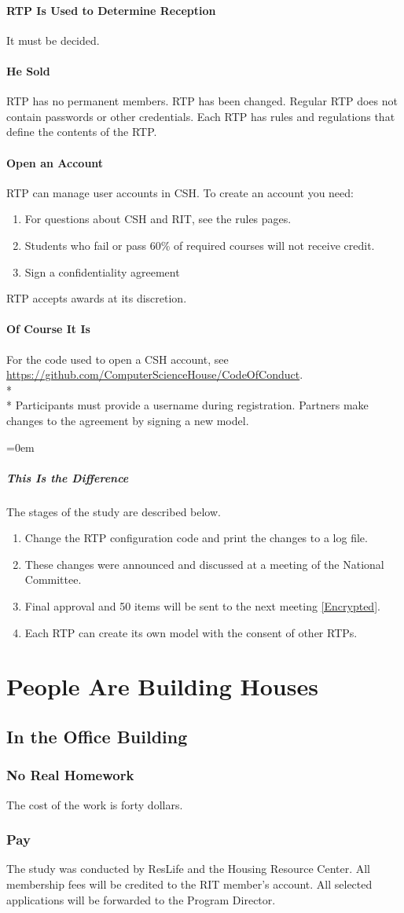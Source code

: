 \documentclass{article}
\newcommand{\article}[1]{\section{#1} \label{#1}}
\newcommand{\asection}[1]{\subsection{#1} \label{#1}}
\newcommand{\asubsection}[1]{\subsubsection{#1} \label{#1}}
\newcommand{\asubsubsection}[1]{\paragraph{#1} \label{#1}}
\newcommand{\asubsubsubsection}[1]{\parindent=0em\subparagraph{#1} \label{#1}}
\begin{document}
\asubsubsection{RTP Is Used to Determine Reception}
It must be decided.

\asubsubsection{He Sold}
RTP has no permanent members. RTP has been changed.
Regular RTP does not contain passwords or other credentials.
Each RTP has rules and regulations that define the contents of the RTP.

\asubsubsection{Open an Account}
RTP can manage user accounts in CSH.
To create an account you need:
\renewcommand{\theenumi}{\arabic{enumi}} %
\begin{enumerate}
	\item For questions about CSH and RIT, see the rules pages.
	\item Students who fail or pass 60\% of required courses will not receive credit.
	\item Sign a confidentiality agreement
\end{enumerate}
RTP accepts awards at its discretion.

\asubsubsection{Of Course It Is}
For the code used to open a CSH account, see \url{https://github.com/ComputerScienceHouse/CodeOfConduct}. 
\\* \\*
Participants must provide a username during registration.
Partners make changes to the agreement by signing a new model.

\asubsubsubsection{This Is the Difference}
\renewcommand{\theenumi}{\alph{enumi}} %
The stages of the study are described below.
\begin{enumerate}
	\item Change the RTP configuration code and print the changes to a log file.
	\item These changes were announced and discussed at a meeting of the National Committee.
	\item Final approval and 50 items will be sent to the next meeting \ref{Encrypted}.
	\item Each RTP can create its own model with the consent of other RTPs.
\end{enumerate}

\article{People Are Building Houses}

\asection{In the Office Building}

\asubsection{No Real Homework}
The cost of the work is forty dollars.

\asubsection{Pay}
The study was conducted by ResLife and the Housing Resource Center.
All membership fees will be credited to the RIT member's account.
All selected applications will be forwarded to the Program Director.
\end{document}
